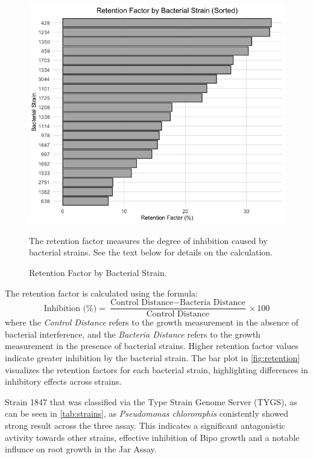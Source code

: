 \begin{figure}[H]
    \centering
    \includegraphics[width=\linewidth]{Figures/RetentionFactor.jpeg}
    \caption{Retention Factor by Bacterial Strain.}
    The retention factor measures the degree of inhibition caused by bacterial strains. 
    See the text below for details on the calculation.
    \label{fig:retention}
\end{figure}

\vspace{0.5cm} %

\noindent
The retention factor is calculated using the formula:
\[
\text{Inhibition (\%)} = \frac{\text{Control Distance} - \text{Bacteria Distance}}{\text{Control Distance}} \times 100
\]
where the \textit{Control Distance} refers to the growth measurement in the absence of bacterial interference, and the \textit{Bacteria Distance} refers to the growth measurement in the presence of bacterial strains. Higher retention factor values indicate greater inhibition by the bacterial strain. The bar plot in \autoref{fig:retention} visualizes the retention factors for each bacterial strain, highlighting differences in inhibitory effects across strains.


Strain 1847 that was classified via the Type Strain Genome Server (TYGS), as can be seen in \autoref{tab:strains}, as \textit{Pseudomonas chlororaphis} conistently showed strong result across the three assay. This indicates a significant antagonistic avtivity towards other strains, effective inhibition of \ac{Bipo} growth and a notable influnce on root growth in the Jar Assay.


